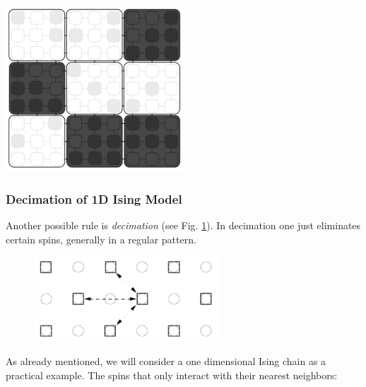 \noindent
\begin{minipage}{\textwidth}
  \centering
  \includegraphics[width=0.5\textwidth]{pics/majority_rule}
  \label{fig:majority_rule}
\end{minipage}




\subsubsection*{Decimation of 1D Ising Model}


Another possible rule is \emph{decimation} (see Fig. \ref{fig:decimation}). In decimation one just eliminates certain spins, generally in a regular pattern. 
\begin{figure}[h!]
  \centering
  \includegraphics[height=90pt]{pics/decimation}
  \label{fig:decimation}
\end{figure}
\vspace{0.2cm}



As already mentioned, we will consider a one dimensional Ising chain as a practical example. The spins that only interact with their nearest neighbors:

\vspace{0.2cm}

